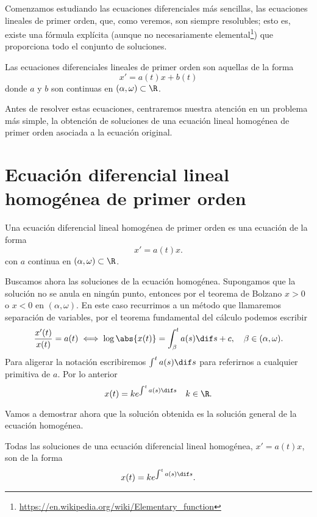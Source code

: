\documentclass[../ecuaciones_diferenciales.tex]{subfiles}
\begin{document}
Comenzamos estudiando las ecuaciones diferenciales más sencillas, las ecuaciones
lineales de primer orden, que, como veremos, son siempre resolubles; esto es,
existe una fórmula explícita (aunque no necesariamente
elemental\footnote{\url{https://en.wikipedia.org/wiki/Elementary_function}}) que
proporciona todo el conjunto de soluciones.

\begin{definition}
	Las ecuaciones diferenciales lineales de primer orden son aquellas de la forma
	\[x' = a(t)x + b(t)\]
	donde \(a\) y \(b\) son continuas en \((\alpha, \omega) \subset \R\).
\end{definition}

Antes de resolver estas ecuaciones, centraremos nuestra atención en un problema
más simple, la obtención de soluciones de una ecuación lineal homogénea de
primer orden asociada a la ecuación original.

\section{Ecuación diferencial lineal homogénea de primer orden} \label{sec:hom}

\begin{definition}
	Una ecuación diferencial lineal homogénea de primer orden es una ecuación de la
	forma
	\[x' = a(t)x.\]
	con \(a\) continua en \((\alpha, \omega) \subset \R\).
\end{definition}

Buscamos ahora las soluciones de la ecuación homogénea. Supongamos que la
solución no se anula en ningún punto, entonces por el teorema de Bolzano
\(x > 0\) o \(x < 0\) en \((\alpha, \omega)\). En este caso recurrimos a un
método que llamaremos separación de variables, por el teorema fundamental del
cálculo podemos escribir
\[\frac{x'(t)}{x(t)} = a(t) \iff \log\abs{x(t)}
	= \int_{\beta}^t a(s) \dif s + c,
	\quad \beta \in (\alpha, \omega).\]
Para aligerar la notación escribiremos \(\int^t a(s) \dif s\) para referirnos
a cualquier primitiva de \(a\). Por lo anterior
\[x(t) = k e^{\int^t a(s) \dif s} \quad k \in \R.\]

Vamos a demostrar ahora que la solución obtenida es la solución general de la
ecuación homogénea.

\begin{theorem}
	Todas las soluciones de una ecuación diferencial lineal homogénea,
	\(x' = a(t)x\), son de la forma
	\begin{equation}
		x(t) = k e^{\int^t a(s) \dif s}. \label{eq:sol_gen}
	\end{equation}
\end{theorem}
\end{document}
